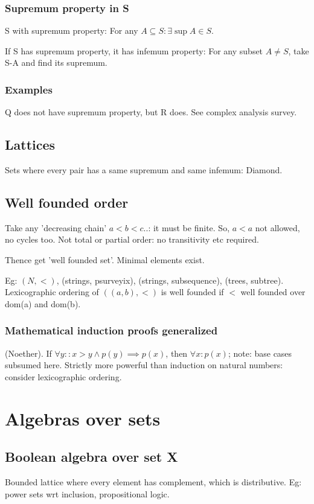 \documentclass[oneside, article]{memoir}
\begin{document}
\subsection{Supremum property in S}
S with supremum property: For any $A \subseteq S: \exists \sup A \in S$.

If S has supremum property, it has infemum property: For any subset $A \neq S$, take S-A and find its supremum.

\subsection{Examples}
Q does not have supremum property, but R does. See complex analysis survey.

\section{Lattices}
Sets where every pair has a same supremum and same infemum: Diamond.

\section{Well founded order}
Take any 'decreasing chain' $a<b<c..$: it must be finite. So, $a<a$ not allowed, no cycles too. Not total or partial order: no transitivity etc required.

Thence get 'well founded set'. Minimal elements exist.

Eg: $(N, <)$, (strings, psurveyix), (strings, subsequence), (trees, subtree). Lexicographic ordering of $((a, b), <)$ is well founded if $<$ well founded over dom(a) and dom(b).

\subsection{Mathematical induction proofs generalized}
(Noether). If $\forall y:: x>y \land p(y) \implies p(x)$, then $\forall x: p(x)$; note: base cases subsumed here. Strictly more powerful than induction on natural numbers: consider lexicographic ordering.

\chapter{Algebras over sets}
\section{Boolean algebra over set X}
Bounded lattice where every element has complement, which is distributive. Eg: power sets wrt inclusion, propositional logic.
\end{document}
